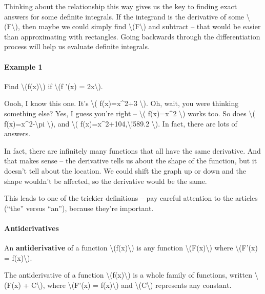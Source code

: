 Thinking about the relationship this way gives us the key to finding
exact answers for some definite integrals. If the integrand is the
derivative of some \textbackslash{}(F\textbackslash{}), then maybe we
could simply find \textbackslash{}(F\textbackslash{}) and subtract --
that would be easier than approximating with rectangles. Going backwards
through the differentiation process will help us evaluate definite
integrals.

\hypertarget{example-1}{%
\paragraph{Example 1}\label{example-1}}

Find \textbackslash{}(f(x)\textbackslash{}) if \textbackslash{}(f '(x) =
2x\textbackslash{}).

Oooh, I know this one. It's \textbackslash{}( f(x)=x\^{}2+3
\textbackslash{}). Oh, wait, you were thinking something else? Yes, I
guess you're right -- \textbackslash{}( f(x)=x\^{}2 \textbackslash{})
works too. So does \textbackslash{}( f(x)=x\^{}2-\textbackslash{}pi
\textbackslash{}), and \textbackslash{}(
f(x)=x\^{}2+104,\textbackslash{}!589.2 \textbackslash{}). In fact, there
are lots of answers.

In fact, there are infinitely many functions that all have the same
derivative. And that makes sense -- the derivative tells us about the
shape of the function, but it doesn't tell about the location. We could
shift the graph up or down and the shape wouldn't be affected, so the
derivative would be the same.

This leads to one of the trickier definitions -- pay careful attention
to the articles (``the'' versus ``an''), because they're important.

\hypertarget{antiderivatives}{%
\paragraph{Antiderivatives}\label{antiderivatives}}

An \textbf{antiderivative} of a function
\textbackslash{}(f(x)\textbackslash{}) is any function
\textbackslash{}(F(x)\textbackslash{}) where \textbackslash{}(F'(x) =
f(x)\textbackslash{}).

The antiderivative of a function \textbackslash{}(f(x)\textbackslash{})
is a whole family of functions, written \textbackslash{}(F(x) +
C\textbackslash{}), where \textbackslash{}(F'(x) = f(x)\textbackslash{})
and \textbackslash{}(C\textbackslash{}) represents any constant.

